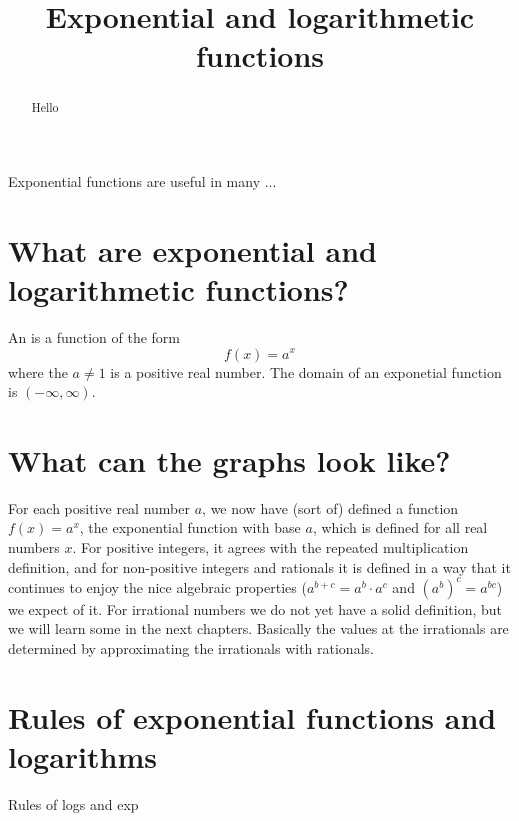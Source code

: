 \documentclass{ximera}
\title[Dig-In:]{Exponential and logarithmetic functions}
\begin{document}
\begin{abstract}
  Hello
\end{abstract}
\maketitle

Exponential functions are useful in many ... 

\section{What are exponential and logarithmetic functions?}


\begin{definition}
  An  is a function of the form
  \[
  f(x) = a^x
  \]
  where the $a\ne 1$ is a positive real number. The domain of an
  exponetial function is $(-\infty,\infty)$.
\end{definition}


\section{What can the graphs look like?}

For each positive real number $a$, we now have (sort of) defined a
function $f(x) = a^x$, the exponential function with base $a$, which
is defined for all real numbers $x$.  For positive integers, it agrees
with the repeated multiplication definition, and for non-positive
integers and rationals it is defined in a way that it continues to
enjoy the nice algebraic properties ($a^{b+c} = a^b \cdot a^c$ and
$(a^b)^c = a^{bc}$) we expect of it.  For irrational numbers we do not
yet have a solid definition, but we will learn some in the next
chapters.  Basically the values at the irrationals are determined by
approximating the irrationals with rationals.



\section{Rules of exponential functions and logarithms}
Rules of logs and exp
\end{document}
